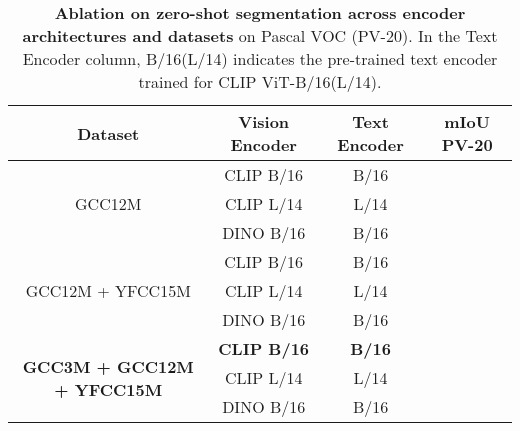 \documentclass[10pt,twocolumn,letterpaper]{article}
\begin{document}
\begin{table}[!t]
    \centering
    \scriptsize
    \resizebox{0.8\linewidth}{!}
    {
    \begin{tabular}{cccc}
    \toprule
    \textbf{Dataset} & \textbf{Vision Encoder} & \textbf{Text Encoder} & \textbf{mIoU PV-20} \\
    \midrule
    \multirow{3}{*}{GCC12M} & CLIP B/16 & B/16 &  \\
                            & CLIP L/14 & L/14 &  \\
                            & DINO B/16 & B/16 &  \\
    \midrule
    \multirow{3}{*}{GCC12M + YFCC15M} & CLIP B/16 & B/16 &  \\
                                      & CLIP L/14 & L/14 &  \\
                                      & DINO B/16 & B/16 &  \\
    \midrule
    \multirow{3}{*}{\textbf{GCC3M + GCC12M + YFCC15M}} & \textbf{CLIP B/16} & \textbf{B/16} &  \\
                                              & CLIP L/14 & L/14 &  \\
                                              & DINO B/16 & B/16 &  \\
    \bottomrule
    \end{tabular}
    }
    \vspace{-2mm}
    \caption{\textbf{Ablation on zero-shot segmentation across encoder architectures and datasets} on Pascal VOC (PV-20). In the Text Encoder column, B/16(L/14) indicates the pre-trained text encoder trained for CLIP ViT-B/16(L/14).}
    \label{table:zeroshot_seg_ablations}
    \vspace{-3mm}
\end{table}
\end{document}

